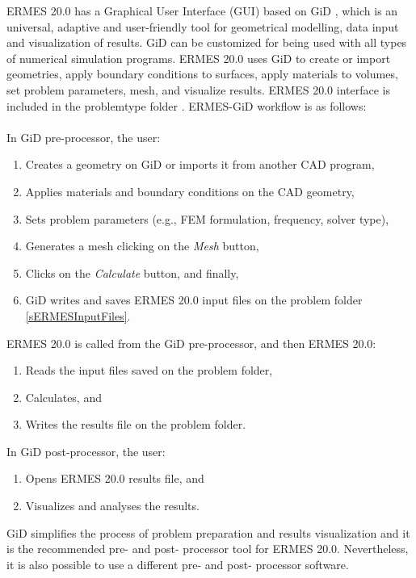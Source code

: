 ERMES 20.0 has a Graphical User Interface (GUI) based on GiD \cite{GiDWeb}, which is an universal, adaptive and user-friendly tool for geometrical modelling, data input and visualization of results. GiD can be customized for being used with all types of numerical simulation programs. ERMES 20.0 uses GiD to create or import geometries, apply boundary conditions to surfaces, apply materials to volumes, set problem parameters, mesh, and visualize results. ERMES 20.0 interface is included in the problemtype folder . ERMES-GiD workflow is as follows:\\ 
\quad\\
In GiD pre-processor, the user:
\begin{enumerate}
	\itemsep0em 
	\item Creates a geometry on GiD or imports it from another CAD program,
	\item Applies materials and boundary conditions on the CAD geometry,
	\item Sets problem parameters (e.g., FEM formulation, frequency, solver type),
	\item Generates a mesh clicking on the \textit{Mesh} button, 
	\item Clicks on the \textit{Calculate} button, and finally,
	\item GiD writes and saves ERMES 20.0 input files on the problem folder \ref{sERMESInputFiles}.
\end{enumerate}
ERMES 20.0 is called from the GiD pre-processor, and then ERMES 20.0:
\begin{enumerate}
    \itemsep0em 
	\item Reads the input files saved on the problem folder,
	\item Calculates, and
	\item Writes the results file on the problem folder.
\end{enumerate}
In GiD post-processor, the user:
\begin{enumerate}
	\itemsep0em 
	\item Opens ERMES 20.0 results file, and
	\item Visualizes and analyses the results.
\end{enumerate}

GiD simplifies the process of problem preparation and results visualization and it is the recommended pre- and post- processor tool for ERMES 20.0. Nevertheless, it is also possible to use a different pre- and post- processor software. 

